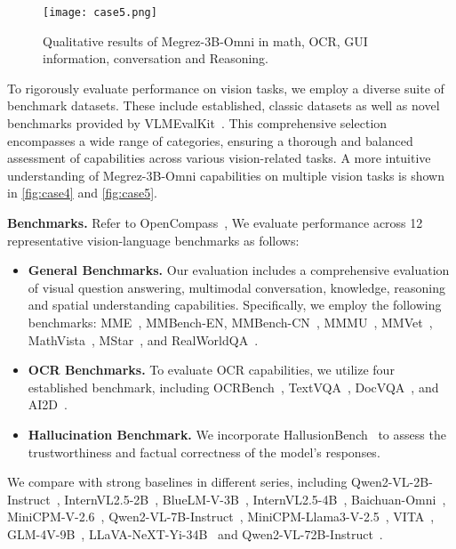 \begin{figure}[htbp]
  \centering
  \texttt{[image: case5.png]}
  \caption{Qualitative results of Megrez-3B-Omni in math, OCR, GUI information, conversation and Reasoning.}
  \label{fig:case5}
\end{figure}


  To rigorously evaluate \ouromnis performance on vision tasks, we employ a diverse suite of benchmark datasets. These include established, classic datasets as well as novel benchmarks provided by VLMEvalKit~\citep{duan2024vlmevalkit}. This comprehensive selection encompasses a wide range of categories, ensuring a thorough and balanced assessment of \ouromnis capabilities across various vision-related tasks. A more intuitive understanding of Megrez-3B-Omni capabilities on multiple vision tasks is shown in  \autoref{fig:case4} and \autoref{fig:case5}.

\textbf{Benchmarks.} \quad 
Refer to OpenCompass~\citep{2023opencompass}, We evaluate \ouromnis performance across 12 representative vision-language benchmarks as follows:
\begin{itemize}
    \item \textbf{General Benchmarks.} Our evaluation includes a comprehensive evaluation of visual question answering, multimodal conversation, knowledge, reasoning and spatial understanding capabilities. Specifically, we employ the following benchmarks: MME~\citep{fu2024mme}, MMBench-EN, MMBench-CN~\citep{liu2023mmbench}, MMMU~\citep{yue2023mmmu}, MMVet~\citep{yu2023mm}, MathVista~\citep{lu2023mathvista}, MStar~\citep{chen2024we}, and RealWorldQA~\citep{grok15}.
    \item \textbf{OCR Benchmarks.} To evaluate OCR capabilities, we utilize four established benchmark, including OCRBench~\citep{liu2024ocrbench}, TextVQA~\citep{singh2019textvqa}, DocVQA~\citep{mathew2021docvqa}, and AI2D~\citep{kembhavi2016diagram}.
    \item \textbf{Hallucination Benchmark.} We incorporate HallusionBench~\citep{guan2024hallusionbench} to assess the trustworthiness and factual correctness of the model's responses.
\end{itemize}



We compare with strong baselines in different series, including Qwen2-VL-2B-Instruct~\citep{Qwen2VL}, InternVL2.5-2B~\citep{chen2024expanding}, BlueLM-V-3B~\citep{lu2024bluelmv3b}, InternVL2.5-4B~\citep{chen2024expanding}, Baichuan-Omni~\citep{li2024baichuanomni}, MiniCPM-V-2.6~\citep{yao2024minicpmv}, Qwen2-VL-7B-Instruct~\citep{Qwen2VL}, MiniCPM-Llama3-V-2.5~\citep{yao2024minicpmv}, VITA~\citep{fu2024vita}, GLM-4V-9B~\citep{glm2024chatglm}, LLaVA-NeXT-Yi-34B~\citep{ai2024yi} and Qwen2-VL-72B-Instruct~\citep{Qwen2VL}.

